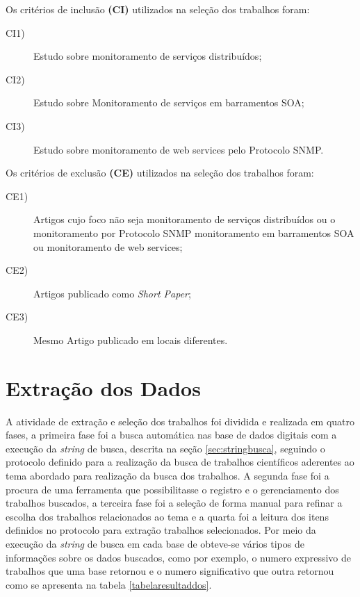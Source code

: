 Os critérios de inclusão \textbf{(CI)} utilizados na seleção dos trabalhos foram:

\begin{description}

\item[CI1)] Estudo sobre monitoramento de serviços distribuídos;
\item[CI2)] Estudo sobre Monitoramento de serviços em barramentos SOA;
\item[CI3)] Estudo sobre monitoramento de web services pelo Protocolo SNMP.
\end{description}

Os critérios de exclusão \textbf{(CE)} utilizados na seleção dos trabalhos foram:

\begin{description}
\item[CE1)]Artigos cujo foco não seja monitoramento de serviços distribuídos ou o monitoramento por Protocolo SNMP monitoramento em barramentos SOA ou monitoramento de web services;
\item[CE2)] Artigos publicado como \textit{Short Paper};
\item[CE3)] Mesmo Artigo publicado em locais diferentes.
\end{description}


\section{Extração dos Dados}
A atividade de extração e seleção dos trabalhos foi dividida e realizada em quatro fases, a primeira fase foi a busca automática nas base de dados digitais com a execução da \textit{string} de busca, descrita na seção \ref{sec:stringbusca}, seguindo o protocolo definido para a realização da busca de trabalhos científicos aderentes ao tema abordado para realização da busca dos trabalhos. A segunda fase foi a procura de uma ferramenta que possibilitasse o registro e o gerenciamento dos trabalhos buscados, a terceira fase foi a seleção de forma manual para refinar a escolha dos trabalhos relacionados ao tema e a quarta foi a leitura dos itens definidos no protocolo para extração trabalhos selecionados.
Por meio da execução da \textit{string} de busca em cada base de obteve-se vários tipos de informações sobre os dados buscados, como por exemplo, o numero expressivo de trabalhos que uma base retornou e o numero significativo que outra retornou como se apresenta na tabela \ref{tabelaresultaddos}.

